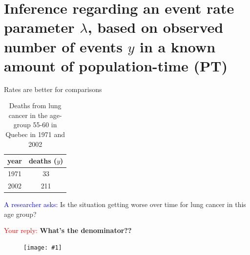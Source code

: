 \documentclass[handout]{beamer}\usepackage[]{graphicx}\usepackage[]{color}
\newcommand {\framedgraphic}[1] {
	\begin{figure}
		\centering
		\texttt{[image: \#1]}
	\end{figure}
}
\newcommand{\blue}[1]{\textcolor{blue}{#1}}
\newcommand{\red}[1]{\textcolor{red}{#1}}
\begin{document}
\section{Inference regarding an event rate parameter $\lambda$, based on observed number of events $y$ in a known amount of population-time (PT)}

\begin{frame}{Rates are better for comparisons}


\begin{table}
\centering
\begin{tabular}{cc}
year & deaths ($y$) \\
\hline
1971 & 33 \\
2002 & 211 \\
\hline
\end{tabular}
\caption{Deaths from lung cancer in the age-group 55-60 in Quebec in 1971 and 2002}
\end{table} 

\pause 

\blue{A researcher asks:} Is the situation getting worse over time for lung cancer in this age group?
\pause

\vspace*{0.5in}

\red{Your reply:} \textbf{What's the denominator??}


\end{frame} 



\begin{frame}
\framedgraphic{patrick.png}
\end{frame}
\end{document}

